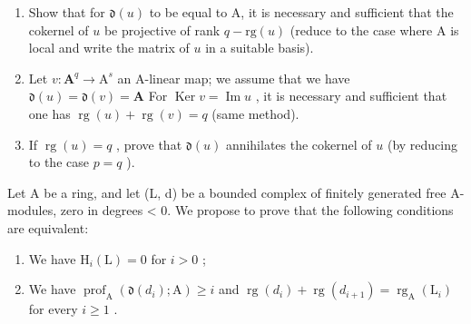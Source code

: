 \begin{enumerate}
\def\labelenumi{\alph{enumi})}
\item
  Show that for \(\mathfrak{d}(u)\) to be equal to A, it is necessary and sufficient that the cokernel of \(u\) be projective of rank \(q - \mathrm{rg}(u)\) (reduce to the case where \(\mathrm{A}\) is local and write the matrix of \(u\) in a suitable basis).
\item
  Let \(v: \mathbf{A}^q \to \mathrm{A}^s\) an A-linear map; we assume that we have \(\mathfrak{d}(u) = \mathfrak{d}(v) = \mathbf{A}\) For \(\operatorname{Ker} v = \operatorname{Im} u\) , it is necessary and sufficient that one has \(\operatorname{rg}(u) + \operatorname{rg}(v) = q\) (same method).
\item
  If \(\operatorname{rg}(u) = q\) , prove that \(\mathfrak{d}(u)\) annihilates the cokernel of \(u\) (by reducing to the case \(p = q\) ).
\end{enumerate}

Let A be a ring, and let (L, d) be a bounded complex of finitely generated free A-modules, zero in degrees \textless{} 0. We propose to prove that the following conditions are equivalent:

\begin{enumerate}
\def\labelenumi{(\roman{enumi})}
\item
  We have \(\mathrm{H}_i(\mathrm{L}) = 0\) for \(i > 0\) ;
\item
  We have \(\operatorname{prof}_{\mathrm{A}}(\mathfrak{d}(d_i); \mathrm{A}) \geqslant i\) and \(\operatorname{rg}(d_i) + \operatorname{rg}(d_{i+1}) = \operatorname{rg}_{\mathrm{A}}(\mathrm{L}_i)\) for every \(i \geqslant 1\) .
\end{enumerate}

